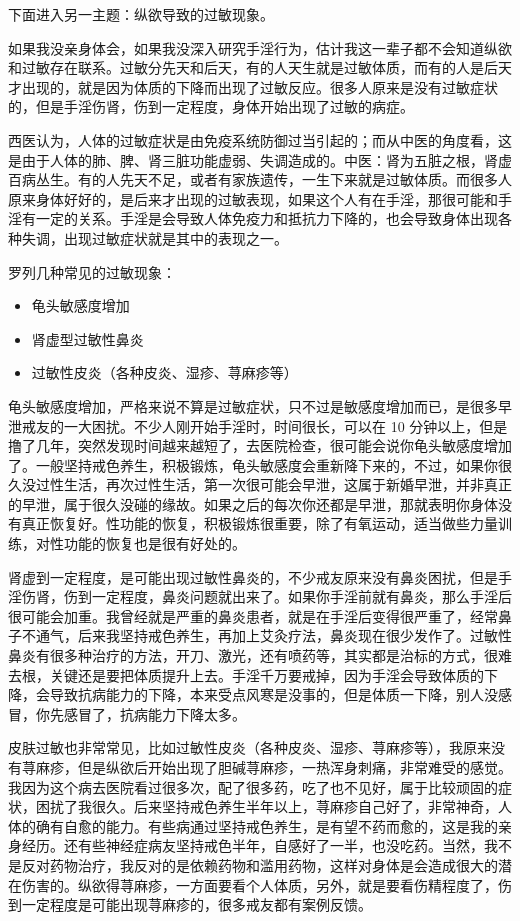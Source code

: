 下面进入另一主题：纵欲导致的过敏现象。

如果我没亲身体会，如果我没深入研究手淫行为，估计我这一辈子都不会知道纵欲和过敏存在联系。过敏分先天和后天，有的人天生就是过敏体质，而有的人是后天才出现的，就是因为体质的下降而出现了过敏反应。很多人原来是没有过敏症状的，但是手淫伤肾，伤到一定程度，身体开始出现了过敏的病症。

西医认为，人体的过敏症状是由免疫系统防御过当引起的；而从中医的角度看，这是由于人体的肺、脾、肾三脏功能虚弱、失调造成的。中医：肾为五脏之根，肾虚百病丛生。有的人先天不足，或者有家族遗传，一生下来就是过敏体质。而很多人原来身体好好的，是后来才出现的过敏表现，如果这个人有在手淫，那很可能和手淫有一定的关系。手淫是会导致人体免疫力和抵抗力下降的，也会导致身体出现各种失调，出现过敏症状就是其中的表现之一。

罗列几种常见的过敏现象：

\begin{itemize}
    \item 龟头敏感度增加
    \item 肾虚型过敏性鼻炎
    \item 过敏性皮炎（各种皮炎、湿疹、荨麻疹等）
\end{itemize}

龟头敏感度增加，严格来说不算是过敏症状，只不过是敏感度增加而已，是很多早泄戒友的一大困扰。不少人刚开始手淫时，时间很长，可以在 10 分钟以上，但是撸了几年，突然发现时间越来越短了，去医院检查，很可能会说你龟头敏感度增加了。一般坚持戒色养生，积极锻炼，龟头敏感度会重新降下来的，不过，如果你很久没过性生活，再次过性生活，第一次很可能会早泄，这属于新婚早泄，并非真正的早泄，属于很久没碰的缘故。如果之后的每次你还都是早泄，那就表明你身体没有真正恢复好。性功能的恢复，积极锻炼很重要，除了有氧运动，适当做些力量训练，对性功能的恢复也是很有好处的。

肾虚到一定程度，是可能出现过敏性鼻炎的，不少戒友原来没有鼻炎困扰，但是手淫伤肾，伤到一定程度，鼻炎问题就出来了。如果你手淫前就有鼻炎，那么手淫后很可能会加重。我曾经就是严重的鼻炎患者，就是在手淫后变得很严重了，经常鼻子不通气，后来我坚持戒色养生，再加上艾灸疗法，鼻炎现在很少发作了。过敏性鼻炎有很多种治疗的方法，开刀、激光，还有喷药等，其实都是治标的方式，很难去根，关键还是要把体质提升上去。手淫千万要戒掉，因为手淫会导致体质的下降，会导致抗病能力的下降，本来受点风寒是没事的，但是体质一下降，别人没感冒，你先感冒了，抗病能力下降太多。

皮肤过敏也非常常见，比如过敏性皮炎（各种皮炎、湿疹、荨麻疹等），我原来没有荨麻疹，但是纵欲后开始出现了胆碱荨麻疹，一热浑身刺痛，非常难受的感觉。我因为这个病去医院看过很多次，配了很多药，吃了也不见好，属于比较顽固的症状，困扰了我很久。后来坚持戒色养生半年以上，荨麻疹自己好了，非常神奇，人体的确有自愈的能力。有些病通过坚持戒色养生，是有望不药而愈的，这是我的亲身经历。还有些神经症病友坚持戒色半年，自感好了一半，也没吃药。当然，我不是反对药物治疗，我反对的是依赖药物和滥用药物，这样对身体是会造成很大的潜在伤害的。纵欲得荨麻疹，一方面要看个人体质，另外，就是要看伤精程度了，伤到一定程度是可能出现荨麻疹的，很多戒友都有案例反馈。

